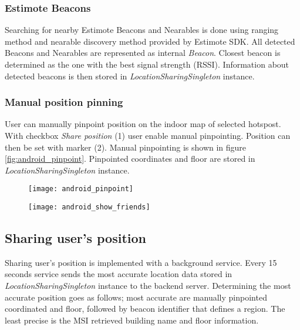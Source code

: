 \subsubsection{Estimote Beacons}
Searching for nearby Estimote Beacons and Nearables is done using ranging method and nearable discovery method provided by Estimote SDK. All detected Beacons and Nearables are represented as internal \textit{Beacon}. Closest beacon is determined as the one with the best signal strength (RSSI). Information about detected beacons is then stored in \textit{LocationSharingSingleton} instance.

\subsubsection{Manual position pinning}
User can manually pinpoint position on the indoor map of selected hotspost. With checkbox \textit{Share position} (1) user enable manual pinpointing. Position can then be set with marker (2). Manual pinpointing is shown in figure \ref{fig:android_pinpoint}. Pinpointed coordinates and floor are stored in \textit{LocationSharingSingleton} instance.

\begin{figure}
\centering
\begin{minipage}{.5\textwidth}
  \centering
  \texttt{[image: android\_pinpoint]}
  \label{fig:android_pinpoint}
\end{minipage}%
\begin{minipage}{.5\textwidth}
  \centering
  \texttt{[image: android\_show\_friends]}
  \label{fig:android_show_friends}
\end{minipage}
\end{figure}

\subsection{Sharing user's position}
Sharing user's position is implemented with a background service. Every 15 seconds service sends the most accurate location data stored in \textit{LocationSharingSingleton} instance to the backend server. Determining the most accurate position goes as follows; most accurate are manually pinpointed coordinated and floor, followed by beacon identifier that defines a region. The least precise is the MSI retrieved building name and floor information.

